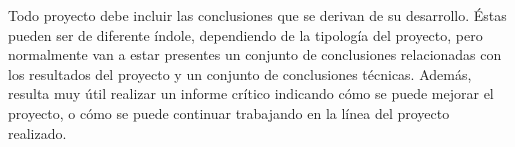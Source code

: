 
Todo proyecto debe incluir las conclusiones que se derivan de su desarrollo. Éstas pueden ser de diferente índole, dependiendo de la tipología del proyecto, pero normalmente van a estar presentes un conjunto de conclusiones relacionadas con los resultados del proyecto y un conjunto de conclusiones técnicas. 
Además, resulta muy útil realizar un informe crítico indicando cómo se puede mejorar el proyecto, o cómo se puede continuar trabajando en la línea del proyecto realizado. 
